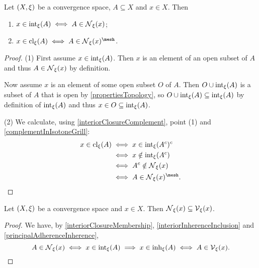 \begin{proposition} \label{interiorClosureMembership}
Let $\left( X,\xi \right)$ be a convergence space, $A\subseteq X$ and $x\in X$. Then
\begin{enumerate}
\item $x\in \operatorname{int}_\xi(A) \iff A \in \operatorname{\mathcal{N}}_\xi(x)$;
\item $x\in \closure_\xi(A) \iff A \in \neighbourhood_\xi(x)^{\mesh}$.
\end{enumerate}
\end{proposition}
\begin{proof}
(1) First assume $x\in \operatorname{int}_\xi(A)$. Then $x$ is an element of an open subset of $A$ and thus $A\in \operatorname{\mathcal{N}}_\xi(x)$ by definition.

Now assume $x$ is an element of some open subset $O$ of $A$. Then $O \cup \operatorname{int}_\xi(A)$ is a subset of $A$ that is open by \ref{propertiesTopology}, so $O \cup \operatorname{int}_\xi(A) \subseteq \operatorname{int}_\xi(A)$ by definition of $\operatorname{int}_\xi(A)$ and thus $x\in O\subseteq \operatorname{int}_\xi(A)$.

(2) We calculate, using \ref{interiorClosureComplement}, point (1) and \ref{complementInIsotoneGrill}:
\begin{align*}
x\in \closure_\xi(A) &\iff x\in \interior_\xi(A^c)^c \\
&\iff x\notin \interior_\xi(A^c) \\
&\iff A^c \notin \neighbourhood_\xi(x) \\
&\iff A \in \neighbourhood_\xi(x)^\mesh.
\end{align*}
\end{proof}

\begin{lemma}
Let $\left( X,\xi \right)$ be a convergence space and $x\in X$. Then $\operatorname{\mathcal{N}}_\xi(x) \subseteq \operatorname{\mathcal{V}}_\xi(x)$.
\end{lemma}
\begin{proof}
We have, by \ref{interiorClosureMembership}, \ref{interiorInherenceInclusion} and \ref{principalAdherenceInherence},
\[ A \in \operatorname{\mathcal{N}}_\xi(x) \iff x\in \operatorname{int}_\xi(A) \implies x\in \operatorname{inh}_\xi(A) \iff A\in\operatorname{\mathcal{V}}_\xi(x). \]
\end{proof}


